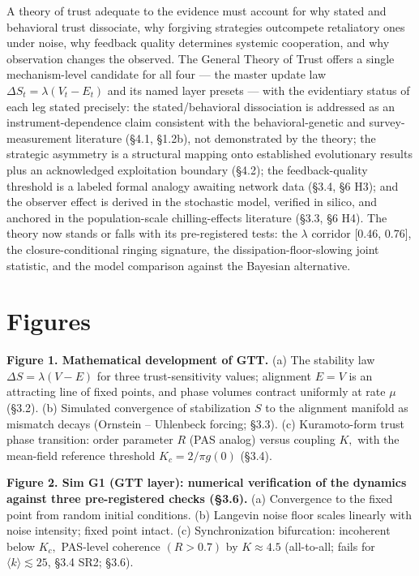 \documentclass[
]{article}
\begin{document}
A theory of trust adequate to the evidence must account for why stated
and behavioral trust dissociate, why forgiving strategies outcompete
retaliatory ones under noise, why feedback quality determines systemic
cooperation, and why observation changes the observed. The General
Theory of Trust offers a single mechanism-level candidate for all four
--- the master update law \(\Delta S_t = \lambda(V_t - E_t)\) and its
named layer presets --- with the evidentiary status of each leg stated
precisely: the stated/behavioral dissociation is addressed as an
instrument-dependence claim consistent with the behavioral-genetic and
survey-measurement literature (§4.1, §1.2b), not demonstrated by the
theory; the strategic asymmetry is a structural mapping onto established
evolutionary results plus an acknowledged exploitation boundary (§4.2);
the feedback-quality threshold is a labeled formal analogy awaiting
network data (§3.4, §6 H3); and the observer effect is derived in the
stochastic model, verified in silico, and anchored in the
population-scale chilling-effects literature (§3.3, §6 H4). The theory
now stands or falls with its pre-registered tests: the \(\lambda\)
corridor {[}0.46, 0.76{]}, the closure-conditional ringing signature,
the dissipation-floor-slowing joint statistic, and the model comparison
against the Bayesian alternative.

\section{Figures}\label{figures}

\textbf{Figure 1. Mathematical development of GTT.} (a) The stability
law \(\Delta S = \lambda(V - E)\) for three trust-sensitivity values;
alignment \(E = V\) is an attracting line of fixed points, and phase
volumes contract uniformly at rate \(\mu\) (§3.2). (b) Simulated
convergence of stabilization \(S\) to the alignment manifold as mismatch
decays (Ornstein -- Uhlenbeck forcing; §3.3). (c) Kuramoto-form trust
phase transition: order parameter \(R\) (PAS analog) versus coupling
\(K,\) with the mean-field reference threshold \(K_c = 2/\pi g(0)\)
(§3.4).

\textbf{Figure 2. Sim G1 (GTT layer): numerical verification of the
dynamics against three pre-registered checks (§3.6).} (a) Convergence to
the fixed point from random initial conditions. (b) Langevin noise floor
scales linearly with noise intensity; fixed point intact. (c)
Synchronization bifurcation: incoherent below \(K_c,\) PAS-level
coherence \((R > 0.7)\) by \(K \approx 4.5\) (all-to-all; fails for
\(\langle k\rangle \lesssim 25\), §3.4 SR2; §3.6).
\end{document}
